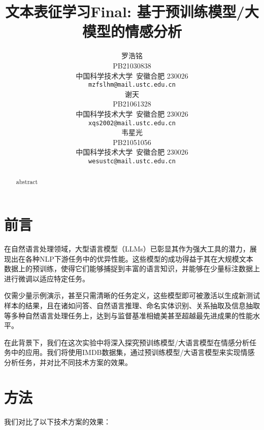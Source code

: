 \documentclass{article}
\title{文本表征学习Final: 基于预训练模型/大模型的情感分析}
\author{
  罗浩铭 \\
  PB21030838\\
  中国科学技术大学\ 安徽合肥 230026 \\
  \texttt{mzfslhm@mail.ustc.edu.cn} \\
  \And
  谢天 \\
  PB21061328\\
  中国科学技术大学\ 安徽合肥 230026 \\
  \texttt{xqs2002@mail.ustc.edu.cn} \\
  \And
  韦星光 \\
  PB21051056\\
  中国科学技术大学\ 安徽合肥 230026 \\
  \texttt{wesustc@mail.ustc.edu.cn} \\
}
\begin{document}
\maketitle


\begin{abstract}
  abstract
\end{abstract}







\section{前言}
在自然语言处理领域，大型语言模型（LLMs）已彰显其作为强大工具的潜力，展现出在各种NLP下游任务中的优异性能。这些模型的成功得益于其在大规模文本数据上的预训练，使得它们能够捕捉到丰富的语言知识，并能够在少量标注数据上进行微调以适应特定任务。

仅需少量示例演示，甚至只需清晰的任务定义，这些模型即可被激活以生成新测试样本的结果，且在诸如问答、自然语言推理、命名实体识别、关系抽取及信息抽取等多种自然语言处理任务上，达到与监督基准相媲美甚至超越最先进成果的性能水平。

在此背景下，我们在这次实验中将深入探究预训练模型/大语言模型在情感分析任务中的应用。我们将使用IMDB数据集，通过预训练模型/大语言模型来实现情感分析任务，并对比不同技术方案的效果。


\section{方法}
我们对比了以下技术方案的效果：
\end{document}
